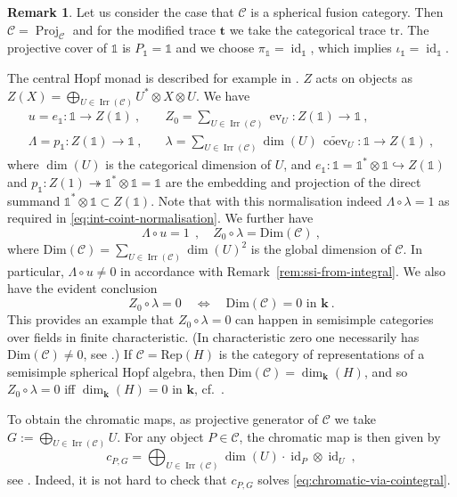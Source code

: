 \documentclass[11pt]{amsart}
\theoremstyle{definition}
\newtheorem{remark}[thm]{Remark}
\numberwithin{equation}{section}
\def\mtr{{\mathbf{t}}} %
\newcommand{\Proj}{\operatorname{Proj}}
\def\cC{\mathcal{C}}
\def\kk{{\bm{k}}}
\def\1{{\mathds{1}}}
\def\to{\rightarrow}
\newcommand\Irr{{\operatorname{Irr}}}
\def\id{{\operatorname{id}}}
\def\ev{{\operatorname{ev}}}
\def\coev{{\operatorname{coev}}}
\begin{document}
\begin{remark}\label{rem:ssi-chromatic}
Let us consider the case that $\cC$ is a spherical fusion category. Then $\cC = \Proj_{\cC}$ and for the modified trace $\mtr$ we take the categorical trace $\mathrm{tr}$.
The projective cover of $\1$ is $P_\1=\1$ and we choose $\pi_\1 = \id_\1$, which implies $\iota_\1 = \id_\1$.

The central Hopf monad is described for example in \cite[Ch.\,9.4]{Turaev:2017uxl}. $Z$ acts on objects as $Z(X) = \bigoplus_{U \in \Irr(\cC)} U^* \otimes X \otimes U$. We have
\begin{equation}
\begin{split}
     u = e_\1 : \1 \to Z(\1) 
     \ ,
     \quad & 
     Z_0 = \sum_{U \in \Irr(\cC)} \ev_U : Z(\1) \to \1  
     \ ,
     \\
     \Lambda = p_\1 : Z(\1) \to \1 \ ,
     \quad &
     \lambda = \sum_{U \in \Irr(\cC)} \dim(U) \,\widetilde{\coev}_U : \1 \to Z(\1) \ ,
\end{split}
\end{equation}
where $\dim(U)$ is the categorical dimension of $U$, and $e_\1 : \1 = \1^* \otimes \1 \hookrightarrow Z(\1)$ and $p_\1 : Z(1) \twoheadrightarrow \1^* \otimes \1 = \1$ are the embedding and projection of the direct summand $\1^* \otimes \1 \subset Z(\1)$. Note that with this normalisation indeed $\Lambda \circ \lambda = 1$ as required in \eqref{eq:int-coint-normalisation}. We further have
\begin{equation}
    \Lambda \circ u = 1
    ~~,\quad
    Z_0 \circ \lambda = \mathrm{Dim}(\cC) \ ,
\end{equation}
where $\mathrm{Dim}(\cC) = \sum_{U \in \Irr(\cC)} \dim(U)^2$ is the global dimension of $\cC$. In particular, $\Lambda \circ u \neq 0$ in accordance with Remark~\ref{rem:ssi-from-integral}. We also have the evident conclusion
\begin{equation}
    Z_0 \circ \lambda = 0 
    \quad \Leftrightarrow \quad 
    \mathrm{Dim}(\cC) = 0 \text{ in } \kk \ .
\end{equation}
This provides an example that $Z_0 \circ \lambda = 0$ can happen in semisimple categories over fields in finite characteristic. (In characteristic zero one necessarily has $\mathrm{Dim}(\cC) \neq 0$, see \cite[Thm.\,7.21.12]{EGNO}.) If $\cC = \mathrm{Rep}(H)$ is the category of representations of a semisimple spherical Hopf algebra, then $\mathrm{Dim}(\cC) = \dim_\kk(H)$, and so $Z_0 \circ \lambda = 0$ iff $\dim_\kk(H) = 0$ in $\kk$, cf.\ \cite[Ex.\,1.5]{CGPV23}.

To obtain the chromatic maps, 
as projective generator of $\cC$ we take $G := \bigoplus_{U \in \Irr(\cC)} U$. 
For any object $P \in \cC$, the chromatic map is then given by 
\begin{equation}
c_{P, G} = \bigoplus_{U \in \Irr(\cC)} \dim(U) \cdot \id_{P} \otimes \id_{U} \ ,
\end{equation}
see \cite[Ex.\,1.4]{CGPV23}.
Indeed, it is not hard to check that $c_{P,G}$ solves \eqref{eq:chromatic-via-cointegral}.
\end{remark}
\end{document}
